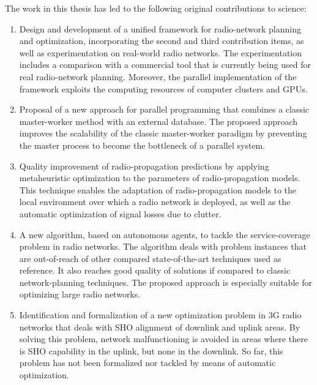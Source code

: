 The work in this thesis has led to the following original contributions
to science:
\begin{enumerate}
\item Design and development of a unified framework for radio-network planning
and optimization, incorporating the second and third contribution
items, as well as experimentation on real-world radio networks. The
experimentation includes a comparison with a commercial tool that
is currently being used for real radio-network planning. Moreover,
the parallel implementation of the framework exploits the computing
resources of computer clusters and GPUs.
\item Proposal of a new approach for parallel programming that combines
a classic master-worker method with an external database. The proposed
approach improves the scalability of the classic master-worker paradigm
by preventing the master process to become the bottleneck of a parallel
system.
\item Quality improvement of radio-propagation predictions by applying metaheuristic
optimization to the parameters of radio-propagation models. This technique
enables the adaptation of radio-propagation models to the local environment
over which a radio network is deployed, as well as the automatic optimization
of signal losses due to clutter.
\item A new algorithm, based on autonomous agents, to tackle the service-coverage
problem in radio networks. The algorithm deals with problem instances
that are out-of-reach of other compared state-of-the-art techniques
used as reference. It also reaches good quality of solutions if compared
to classic network-planning techniques. The proposed approach is especially
suitable for optimizing large radio networks.
\item Identification and formalization of a new optimization problem in
3G radio networks that deals with SHO alignment of downlink and uplink
areas. By solving this problem, network malfunctioning is avoided
in areas where there is SHO capability in the uplink, but none in
the downlink. So far, this problem has not been formalized nor tackled
by means of automatic optimization.\end{enumerate}

